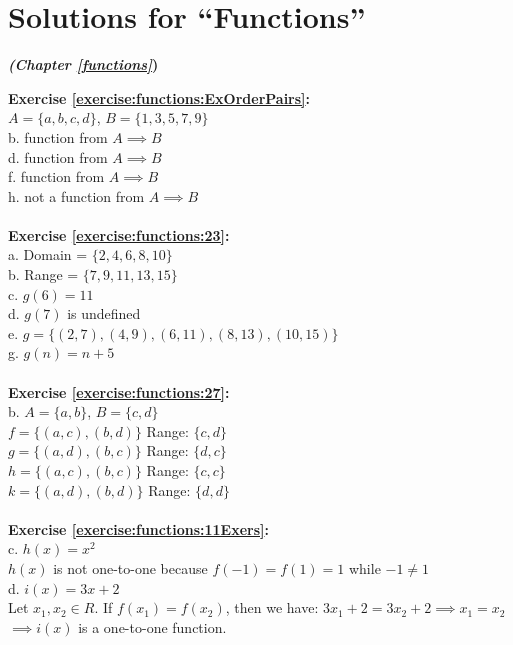 \section{Solutions for ``Functions''}
\noindent\textbf{\textit{ (Chapter \ref{functions}})}\bigskip

\textbf{Exercise \ref{exercise:functions:ExOrderPairs}:}\\
$A=\{a,b,c,d\}$, $B=\{1,3,5,7,9\}$\\
b. function from $A \implies B$\\
d. function from $A \implies B$\\
f. function from $A \implies B$\\
h. not a function from $A \implies B$\\
\\
\textbf{Exercise \ref{exercise:functions:23}:}\\
a. Domain = $\{2,4,6,8,10\}$\\
b. Range = $\{7,9,11,13,15\}$\\
c. $g(6)=11$\\
d. $g(7)$ is undefined\\
e. $g=\{(2,7),(4,9),(6,11),(8,13),(10,15)\}$\\
g. $g(n)=n+5$\\
\\
\textbf{Exercise \ref{exercise:functions:27}:}\\
b. $A=\{a,b\}$, $B=\{c,d\}$\\
$f=\{(a,c),(b,d)\}$ Range: $\{c,d\}$\\
$g=\{(a,d),(b,c)\}$ Range: $\{d,c\}$\\
$h=\{(a,c),(b,c)\}$ Range: $\{c,c\}$\\
$k=\{(a,d),(b,d)\}$ Range: $\{d,d\}$\\
\\
\textbf{Exercise \ref{exercise:functions:11Exers}:}\\
c. $h(x)=x^2$\\
$h(x)$ is not one-to-one because $f(-1)=f(1)=1$ while $-1\neq 1$\\
d. $i(x)=3x+2$\\
Let $x_1,x_2 \in R$. If $f(x_1)=f(x_2)$, then we have:
$3x_1+2=3x_2+2 \implies x_1=x_2$\\
$\implies i(x)$ is a one-to-one function.\\
\\
